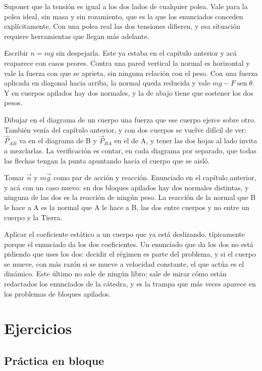 \documentclass[11pt,openany]{book}
\newcommand{\sen}{\operatorname{sen}}
\begin{document}
\begin{erroresComunes}
  \item Suponer que la tensión es igual a los dos lados de cualquier polea. Vale para la polea ideal, sin masa y sin rozamiento, que es la que los enunciados conceden explícitamente. Con una polea real las dos tensiones difieren, y esa situación requiere herramientas que llegan más adelante.
  \item Escribir $n = mg$ sin despejarla. Este ya estaba en el capítulo anterior y acá reaparece con casos peores. Contra una pared vertical la normal es horizontal y vale la fuerza con que se aprieta, sin ninguna relación con el peso. Con una fuerza aplicada en diagonal hacia arriba, la normal queda reducida y vale $mg - F\sen\theta$. Y en cuerpos apilados hay dos normales, y la de abajo tiene que sostener los dos pesos.
  \item Dibujar en el diagrama de un cuerpo una fuerza que ese cuerpo ejerce sobre otro. También venía del capítulo anterior, y con dos cuerpos se vuelve difícil de ver: $\vec P_{AB}$ va en el diagrama de B y $\vec P_{BA}$ en el de A, y tener las dos hojas al lado invita a mezclarlas. La verificación es contar, en cada diagrama por separado, que todas las flechas tengan la punta apuntando hacia el cuerpo que se aisló.
  \item Tomar $\vec n$ y $m\vec g$ como par de acción y reacción. Enunciado en el capítulo anterior, y acá con un caso nuevo: en dos bloques apilados hay dos normales distintas, y ninguna de las dos es la reacción de ningún peso. La reacción de la normal que B le hace a A es la normal que A le hace a B, las dos entre cuerpos y no entre un cuerpo y la Tierra.
  \item Aplicar el coeficiente estático a un cuerpo que ya está deslizando, típicamente porque el enunciado da los dos coeficientes. Un enunciado que da los dos no está pidiendo que uses los dos: decidir el régimen es parte del problema, y si el cuerpo se mueve, con más razón si se mueve a velocidad constante, el que actúa es el dinámico. Este último no sale de ningún libro; sale de mirar cómo están redactados los enunciados de la cátedra, y es la trampa que más veces aparece en los problemas de bloques apilados.
\end{erroresComunes}

\section{Ejercicios}

\subsection{Práctica en bloque}
\end{document}
